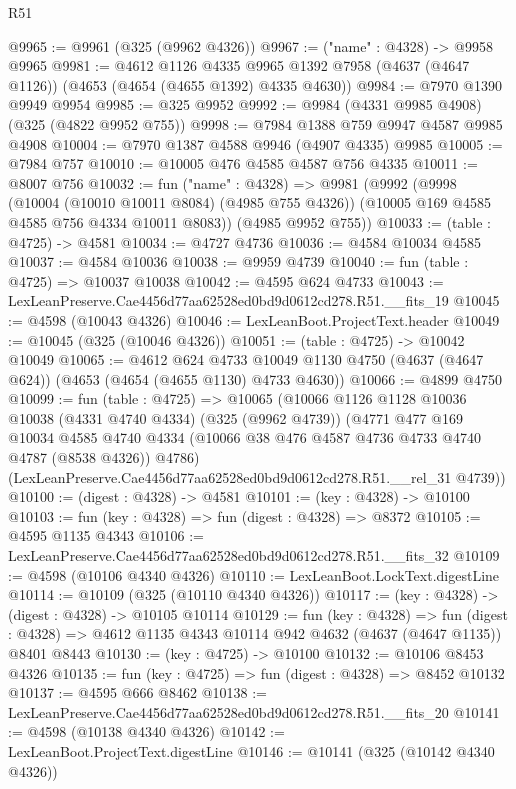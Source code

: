 \begin{lexlean}{R51}
\begin{coremodule}
@9965 := @9961 (@325 (@9962 @4326))
@9967 := ("name" : @4328) -> @9958 @9965
@9981 := @4612
    @1126
    @4335
    @9965
    @1392
    @7958
    (@4637 (@4647 @1126))
    (@4653 (@4654 (@4655 @1392) @4335 @4630))
@9984 := @7970 @1390 @9949 @9954
@9985 := @325 @9952
@9992 := @9984 (@4331 @9985 @4908) (@325 (@4822 @9952 @755))
@9998 := @7984 @1388 @759 @9947 @4587 @9985 @4908
@10004 := @7970 @1387 @4588 @9946 (@4907 @4335) @9985
@10005 := @7984 @757
@10010 := @10005 @476 @4585 @4587 @756 @4335
@10011 := @8007 @756
@10032 := fun ("name" : @4328) =>
  @9981
    (@9992
      (@9998
        (@10004 (@10010 @10011 @8084) (@4985 @755 @4326))
        (@10005 @169 @4585 @4585 @756 @4334 @10011 @8083))
      (@4985 @9952 @755))
@10033 := (table : @4725) -> @4581
@10034 := @4727 @4736
@10036 := @4584 @10034 @4585
@10037 := @4584 @10036
@10038 := @9959 @4739
@10040 := fun (table : @4725) => @10037 @10038
@10042 := @4595 @624 @4733
@10043 := LexLeanPreserve.Cae4456d77aa62528ed0bd9d0612cd278.R51.__fits_19
@10045 := @4598 (@10043 @4326)
@10046 := LexLeanBoot.ProjectText.header
@10049 := @10045 (@325 (@10046 @4326))
@10051 := (table : @4725) -> @10042 @10049
@10065 := @4612
    @624
    @4733
    @10049
    @1130
    @4750
    (@4637 (@4647 @624))
    (@4653 (@4654 (@4655 @1130) @4733 @4630))
@10066 := @4899 @4750
@10099 := fun (table : @4725) =>
  @10065
    (@10066
      @1126
      @1128
      @10036
      @10038
      (@4331 @4740 @4334)
      (@325 (@9962 @4739))
      (@4771
        @477
        @169
        @10034
        @4585
        @4740
        @4334
        (@10066 @38 @476 @4587 @4736 @4733 @4740 @4787 (@8538 @4326))
        @4786)
      (LexLeanPreserve.Cae4456d77aa62528ed0bd9d0612cd278.R51.__rel_31 @4739))
@10100 := (digest : @4328) -> @4581
@10101 := (key : @4328) -> @10100
@10103 := fun (key : @4328) => fun (digest : @4328) => @8372
@10105 := @4595 @1135 @4343
@10106 := LexLeanPreserve.Cae4456d77aa62528ed0bd9d0612cd278.R51.__fits_32
@10109 := @4598 (@10106 @4340 @4326)
@10110 := LexLeanBoot.LockText.digestLine
@10114 := @10109 (@325 (@10110 @4340 @4326))
@10117 := (key : @4328) -> (digest : @4328) -> @10105 @10114
@10129 := fun (key : @4328) =>
  fun (digest : @4328) => @4612 @1135 @4343 @10114 @942 @4632 (@4637 (@4647 @1135)) @8401 @8443
@10130 := (key : @4725) -> @10100
@10132 := @10106 @8453 @4326
@10135 := fun (key : @4725) => fun (digest : @4328) => @8452 @10132
@10137 := @4595 @666 @8462
@10138 := LexLeanPreserve.Cae4456d77aa62528ed0bd9d0612cd278.R51.__fits_20
@10141 := @4598 (@10138 @4340 @4326)
@10142 := LexLeanBoot.ProjectText.digestLine
@10146 := @10141 (@325 (@10142 @4340 @4326))

\end{coremodule}
\end{lexlean}
